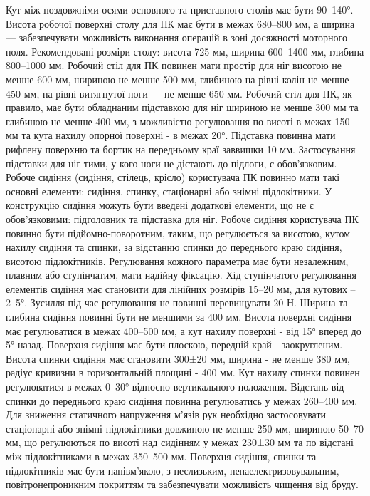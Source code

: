 \documentclass[12pt,a4paper]{article}
\begin{document}
Кут між поздовжніми осями основного та приставного столів має бути 90–140°.
Висота робочої поверхні столу для ПК має бути в межах 680–800 мм, а ширина — забезпечувати можливість виконання операцій в зоні досяжності моторного поля.
Рекомендовані розміри столу: висота 725 мм, ширина 600–1400 мм, глибина 800–1000 мм.
Робочий стіл для ПК повинен мати простір для ніг висотою не менше 600 мм, шириною не менше 500 мм, глибиною на рівні колін не менше 450 мм, на рівні витягнутої ноги — не менше 650 мм.
Робочий стіл для ПК, як правило, має бути обладнаним підставкою для ніг шириною не менше 300 мм та глибиною не менше 400 мм, з можливістю регулювання по висоті в межах 150 мм та кута нахилу опорної поверхні - в межах 20°. Підставка повинна мати рифлену поверхню та бортик на передньому краї заввишки 10 мм. Застосування підставки для ніг тими, у кого ноги не дістають до підлоги, є обов’язковим.
Робоче сидіння (сидіння, стілець, крісло) користувача ПК повинно мати такі основні елементи: сидіння, спинку, стаціонарні або знімні підлокітники. У конструкцію сидіння можуть бути введені додаткові елементи, що не є обов’язковими: підголовник та підставка для ніг. 
Робоче сидіння користувача ПК повинно бути підйомно-поворотним, таким, що регулюється за висотою, кутом нахилу сидіння та спинки, за відстанню спинки до переднього краю сидіння, висотою підлокітників. Регулювання кожного параметра має бути незалежним, плавним або ступінчатим, мати надійну фіксацію.
Хід ступінчатого регулювання елементів сидіння має становити для лінійних розмірів 15–20 мм, для кутових – 2–5°. Зусилля під час регулювання не повинні перевищувати 20 Н. Ширина та глибина сидіння повинні бути не меншими за 400 мм. Висота поверхні сидіння має регулюватися в межах 400–500 мм, а кут нахилу поверхні - від 15° вперед до 5° назад. Поверхня сидіння має бути плоскою, передній край - заокругленим. Висота спинки сидіння має становити 300±20 мм, ширина - не менше 380 мм, радіус кривизни в горизонтальній площині - 400 мм. Кут нахилу спинки повинен регулюватися в межах 0–30° відносно вертикального положення. Відстань від спинки до переднього краю сидіння повинна регулюватись у межах 260–400 мм.
Для зниження статичного напруження м’язів рук необхідно застосовувати стаціонарні або знімні підлокітники довжиною не менше 250 мм, шириною 50–70 мм, що регулюються по висоті над сидінням у межах 230±30 мм та по відстані між підлокітниками в межах 350–500 мм.
Поверхня сидіння, спинки та підлокітників має бути напівм’якою, з неслизьким, ненаелектризовувальним, повітронепроникним покриттям та забезпечувати можливість чищення від бруду.
\end{document}
